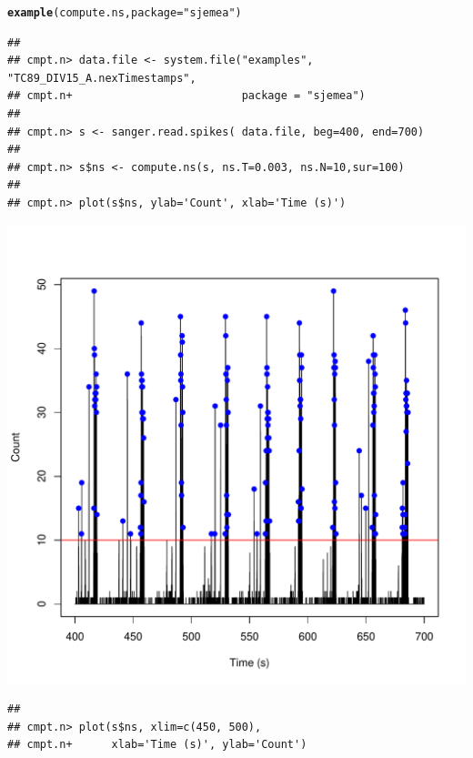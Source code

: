 \documentclass{article}\usepackage[]{graphicx}\usepackage[]{color}
\makeatletter
\def\maxwidth{ %
  \ifdim\Gin@nat@width>\linewidth
    \linewidth
  \else
    \Gin@nat@width
  \fi
}
\newcommand{\hlstr}[1]{\textcolor[rgb]{0.192,0.494,0.8}{#1}}%
\newcommand{\hlstd}[1]{\textcolor[rgb]{0.345,0.345,0.345}{#1}}%
\newcommand{\hlkwc}[1]{\textcolor[rgb]{0.333,0.667,0.333}{#1}}%
\newcommand{\hlkwd}[1]{\textcolor[rgb]{0.737,0.353,0.396}{\textbf{#1}}}%
\newenvironment{kframe}{%
 \def\at@end@of@kframe{}%
 \ifinner\ifhmode%
  \def\at@end@of@kframe{\end{minipage}}%
  \begin{minipage}{\columnwidth}%
 \fi\fi%
 \def\FrameCommand##1{\hskip\@totalleftmargin \hskip-\fboxsep
 \colorbox{shadecolor}{##1}\hskip-\fboxsep
     \hskip-\linewidth \hskip-\@totalleftmargin \hskip\columnwidth}%
 \MakeFramed {\advance\hsize-\width
   \@totalleftmargin\z@ \linewidth\hsize
   \@setminipage}}%
 {\par\unskip\endMakeFramed%
 \at@end@of@kframe}
\newenvironment{knitrout}{}{} %
\makeatother
\begin{document}
\begin{knitrout}
\color{fgcolor}\begin{kframe}
\begin{alltt}
\hlkwd{example}\hlstd{(compute.ns,} \hlkwc{package} \hlstd{=} \hlstr{"sjemea"}\hlstd{)}
\end{alltt}
\begin{verbatim}
## 
## cmpt.n> data.file <- system.file("examples", "TC89_DIV15_A.nexTimestamps",
## cmpt.n+                          package = "sjemea")
## 
## cmpt.n> s <- sanger.read.spikes( data.file, beg=400, end=700)
## 
## cmpt.n> s$ns <- compute.ns(s, ns.T=0.003, ns.N=10,sur=100)
## 
## cmpt.n> plot(s$ns, ylab='Count', xlab='Time (s)')
\end{verbatim}
\end{kframe}
\includegraphics[width=\maxwidth]{figure/network_spikes1} 
\begin{kframe}\begin{verbatim}
## 
## cmpt.n> plot(s$ns, xlim=c(450, 500),
## cmpt.n+      xlab='Time (s)', ylab='Count')
\end{verbatim}
\end{kframe}

\end{knitrout}
\end{document}
